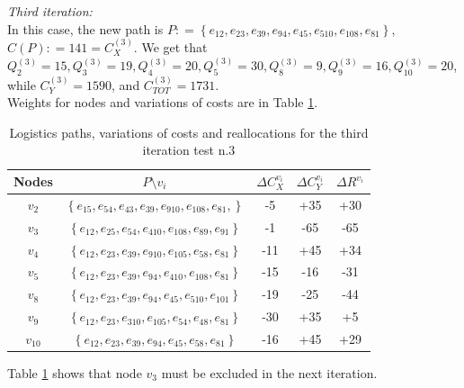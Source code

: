 \textit{Third iteration:}\\
In this case, the new path is $P : = \left\{e_{12},e_{23}, e_{39}, e_{94}, e_{45}, e_{510}, e_{108}, e_{81} \right\}$, $C(P) : = 141 = C_X^{(3)}$. We get that $Q_2^{(3)} = 15, Q_3^{(3)} = 19, Q_4^{(3)} = 20, Q_5^{(3)} = 30,Q_8^{(3)} = 9,Q_9^{(3)} = 16,Q_10^{(3)} = 20$, while $C_Y^{(3)} = 1590$, and $C_{TOT}^{(3)} = 1731$.\\
Weights for nodes and variations of costs are in Table \ref{tab:reallocation-plan-third-it-test3}.
\begin{table}[h]
    \centering
    \begin{tabular}{|c|c|c|c|c|}
        \hline
        \textbf{Nodes} & \textbf{$P \setminus v_i$} & \textbf{$\Delta C_X^{v_i}$} & \textbf{$\Delta C_Y^{v_i}$} & \textbf{$\Delta R^{v_i}$} \\
        \hline
        $v_2$ & $\left\{e_{15},  e_{54}, e_{43}, e_{39}, e_{910}, e_{108}, e_{81}, \right\}$ & -5 & +35 & +30 \\
        \hline
        $v_3$ & $\left\{e_{12},  e_{25},  e_{54},  e_{410},  e_{108},  e_{89},  e_{91}  \right\}$ & -1 & -65 & -65 \\
        \hline
        $v_4$ & $\left\{e_{12},  e_{23},  e_{39},  e_{910},  e_{105},  e_{58},  e_{81}  \right\}$ & -11 & +45 & +34 \\
        \hline
        $v_5$ & $\left\{ e_{12},  e_{23},  e_{39},  e_{94},  e_{410},  e_{108},  e_{81}  \right\}$ & -15 & -16 & -31 \\
        \hline
        $v_8$ & $\left\{e_{12},  e_{23},  e_{39},  e_{94},  e_{45},  e_{510},  e_{101}   \right\}$ & -19 & -25 & -44 \\
        \hline
        $v_9$ & $\left\{e_{12},  e_{23},  e_{310},  e_{105},  e_{54},  e_{48},  e_{81}   \right\}$ & -30 & +35 & +5 \\
        \hline
        $v_10$ & $\left\{ e_{12},  e_{23},  e_{39},  e_{94},  e_{45},  e_{58},  e_{81}  \right\}$ & -16 & +45 & +29 \\
        \hline
    \end{tabular}

    \caption{Logistics paths, variations of costs and reallocations for the third iteration test n.3}
    \label{tab:reallocation-plan-third-it-test3}
\end{table}
Table \ref{tab:reallocation-plan-third-it-test3} shows that node $v_3$ must be excluded in the next iteration.

